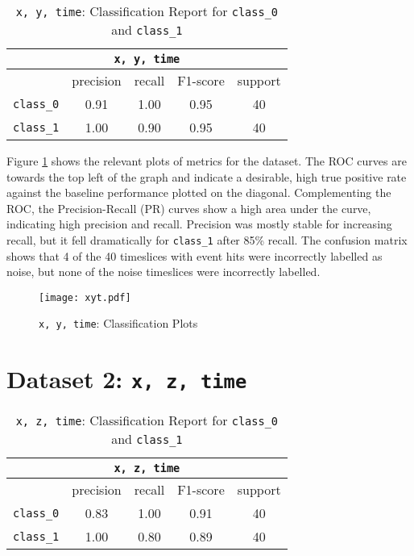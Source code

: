 \begin{table} [ht!]
    \centering
    \begin{tabular}{l c c c c}
    \hline
    \multicolumn{5}{c}{\texttt{x, y, time}} \\
    \hline
                     & precision  & recall& F1-score & support \\
        \texttt{class\_0} & 0.91  &  1.00    & 0.95 & 40\\
        \texttt{class\_1} & 1.00  &  0.90    & 0.95 & 40\\
    \hline
    \end{tabular}
    \caption{\texttt{x, y, time}: Classification Report for \texttt{class\_0} and \texttt{class\_1}}
    \label{tab:xyt_classification_report}
\end{table}

Figure \ref{fig:xyt_results} shows the relevant plots  of metrics for the dataset. The ROC curves are towards the top left of the graph and indicate a desirable, high true positive rate against the baseline performance plotted on the diagonal. Complementing the ROC, the Precision-Recall (PR) curves show a high area under the curve, indicating high precision and recall. Precision was mostly stable for increasing recall, but it fell dramatically for \texttt{class\_1} after 85\% recall. The confusion matrix shows that 4 of the 40 timeslices with event hits were incorrectly labelled as noise, but none of the noise timeslices were incorrectly labelled.
 
\begin{figure}[ht!]
    \centering
    \texttt{[image: xyt.pdf]}
    \caption{\texttt{x, y, time}: Classification Plots}
    \label{fig:xyt_results}
\end{figure}

\section{Dataset 2: \texttt{x, z, time}}
\begin{table} [ht!]
    \centering
    \begin{tabular}{l c c c c}
    \hline
    \multicolumn{5}{c}{\texttt{x, z, time}} \\
    \hline
                     & precision & recall & F1-score & support \\
        \texttt{class\_0}  & 0.83 &  1.00    & 0.91 & 40\\
        \texttt{class\_1}  & 1.00 &  0.80    & 0.89 & 40\\
    \hline
    \end{tabular}
    \caption{\texttt{x, z, time}: Classification Report for \texttt{class\_0} and \texttt{class\_1}}
    \label{tab:xzt_classification_report}
\end{table}

